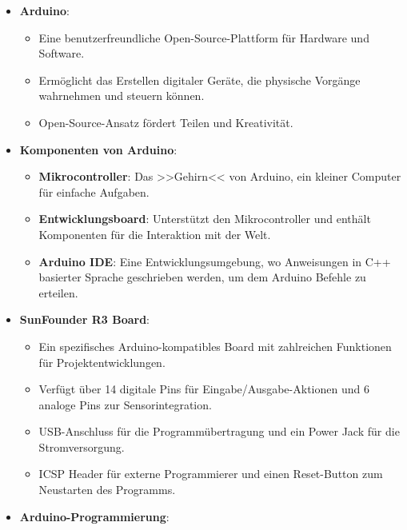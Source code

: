 \documentclass{vorlage-design-main}
\begin{document}
\begin{itemize}

\item
  \textbf{Arduino}:

  \begin{itemize}
  
  \item
    Eine benutzerfreundliche Open-Source-Plattform für Hardware und
    Software.
  \item
    Ermöglicht das Erstellen digitaler Geräte, die physische Vorgänge
    wahrnehmen und steuern können.
  \item
    Open-Source-Ansatz fördert Teilen und Kreativität.
  \end{itemize}
\item
  \textbf{Komponenten von Arduino}:

  \begin{itemize}
  
  \item
    \textbf{Mikrocontroller}: Das >>Gehirn<< von Arduino, ein kleiner
    Computer für einfache Aufgaben.
  \item
    \textbf{Entwicklungsboard}: Unterstützt den Mikrocontroller und
    enthält Komponenten für die Interaktion mit der Welt.
  \item
    \textbf{Arduino IDE}: Eine Entwicklungsumgebung, wo Anweisungen in
    C++ basierter Sprache geschrieben werden, um dem Arduino Befehle zu
    erteilen.
  \end{itemize}
\item
  \textbf{SunFounder R3 Board}:

  \begin{itemize}
  
  \item
    Ein spezifisches Arduino-kompatibles Board mit zahlreichen
    Funktionen für Projektentwicklungen.
  \item
    Verfügt über 14 digitale Pins für Eingabe/Ausgabe-Aktionen und 6
    analoge Pins zur Sensorintegration.
  \item
    USB-Anschluss für die Programmübertragung und ein Power Jack für die
    Stromversorgung.
  \item
    ICSP Header für externe Programmierer und einen Reset-Button zum
    Neustarten des Programms.
  \end{itemize}
\item
  \textbf{Arduino-Programmierung}:

  \begin{itemize}
  

\end{itemize}
\end{itemize}
\end{document}
